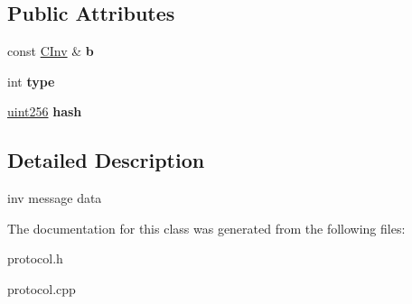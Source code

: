 \subsection*{Public Attributes}
\begin{DoxyCompactItemize}
\item 
\mbox{\label{class_c_inv_a993210654ce7bd94983d778ac4f4858a}} 
const \mbox{\hyperlink{class_c_inv}{C\+Inv}} \& {\bfseries b}
\item 
\mbox{\label{class_c_inv_a2da8a26c6b8824011e3144459d278c75}} 
int {\bfseries type}
\item 
\mbox{\label{class_c_inv_abfa04c38e9c0def9a2b09a9c43929744}} 
\mbox{\hyperlink{classuint256}{uint256}} {\bfseries hash}
\end{DoxyCompactItemize}


\subsection{Detailed Description}
inv message data 

The documentation for this class was generated from the following files\+:\begin{DoxyCompactItemize}
\item 
protocol.\+h\item 
protocol.\+cpp\end{DoxyCompactItemize}
